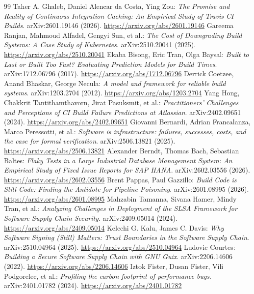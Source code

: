 \documentclass[11pt,a4paper]{article}
\begin{document}
\begin{thebibliography}{99}
 Taher A. Ghaleb, Daniel Alencar da Costa, Ying Zou: \emph{The Promise and Reality of Continuous Integration Caching: An Empirical Study of Travis CI Builds}. arXiv:2601.19146 (2026). \url{https://arxiv.org/abs/2601.19146}
 Gareema Ranjan, Mahmoud Alfadel, Gengyi Sun, et al.: \emph{The Cost of Downgrading Build Systems: A Case Study of Kubernetes}. arXiv:2510.20041 (2025). \url{https://arxiv.org/abs/2510.20041}
 Ekaba Bisong, Eric Tran, Olga Baysal: \emph{Built to Last or Built Too Fast? Evaluating Prediction Models for Build Times}. arXiv:1712.06796 (2017). \url{https://arxiv.org/abs/1712.06796}
 Derrick Coetzee, Anand Bhaskar, George Necula: \emph{A model and framework for reliable build systems}. arXiv:1203.2704 (2012). \url{https://arxiv.org/abs/1203.2704}
 Yang Hong, Chakkrit Tantithamthavorn, Jirat Pasuksmit, et al.: \emph{Practitioners' Challenges and Perceptions of CI Build Failure Predictions at Atlassian}. arXiv:2402.09651 (2024). \url{https://arxiv.org/abs/2402.09651}
 Giovanni Bernardi, Adrian Francalanza, Marco Peressotti, et al.: \emph{Software is infrastructure: failures, successes, costs, and the case for formal verification}. arXiv:2506.13821 (2025). \url{https://arxiv.org/abs/2506.13821}
 Alexander Berndt, Thomas Bach, Sebastian Baltes: \emph{Flaky Tests in a Large Industrial Database Management System: An Empirical Study of Fixed Issue Reports for SAP HANA}. arXiv:2602.03556 (2026). \url{https://arxiv.org/abs/2602.03556}
 Brent Pappas, Paul Gazzillo: \emph{Build Code is Still Code: Finding the Antidote for Pipeline Poisoning}. arXiv:2601.08995 (2026). \url{https://arxiv.org/abs/2601.08995}
 Mahzabin Tamanna, Sivana Hamer, Mindy Tran, et al.: \emph{Analyzing Challenges in Deployment of the SLSA Framework for Software Supply Chain Security}. arXiv:2409.05014 (2024). \url{https://arxiv.org/abs/2409.05014}
 Kelechi G. Kalu, James C. Davis: \emph{Why Software Signing (Still) Matters: Trust Boundaries in the Software Supply Chain}. arXiv:2510.04964 (2025). \url{https://arxiv.org/abs/2510.04964}
 Ludovic Courtes: \emph{Building a Secure Software Supply Chain with GNU Guix}. arXiv:2206.14606 (2022). \url{https://arxiv.org/abs/2206.14606}
 Iztok Fister, Dusan Fister, Vili Podgorelec, et al.: \emph{Profiling the carbon footprint of performance bugs}. arXiv:2401.01782 (2024). \url{https://arxiv.org/abs/2401.01782}

\end{thebibliography}
\end{document}
